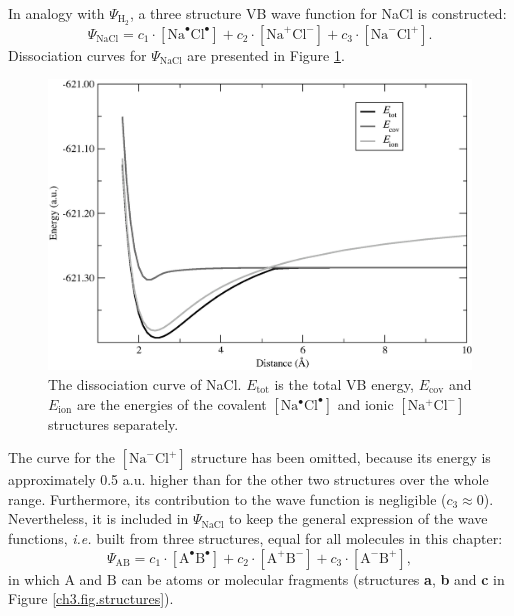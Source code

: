 In analogy with $\Psi_{\mathrm{H_2}}$, a three structure VB wave function for NaCl is constructed:
\begin{equation}
\nonumber
\Psi_{\mathrm{NaCl}} = c_1\cdot [\mathrm{Na}^\bullet \mathrm{Cl}^\bullet] + c_2 \cdot [\mathrm{Na}^{+}\mathrm{Cl}^{-}] + c_3 \cdot [\mathrm{Na}^{-}\mathrm{Cl}^{+}]. 
\end{equation}
Dissociation curves for $\Psi_{\mathrm{NaCl}}$ are presented in Figure \ref{ch3.fig.nacl_c}.
\begin{figure}[hbtp]
\begin{center}
\includegraphics[scale=0.6]{dissociation/figures/nacl_g.eps}
\end{center}
\caption{The dissociation curve of NaCl. $E_\mathrm{tot}$ is the total VB energy, $E_\mathrm{cov}$  and $E_\mathrm{ion}$ are the energies of the covalent $[\mathrm{Na^\bullet Cl^\bullet}]$ and ionic $[\mathrm{Na^{+}Cl^{-}}]$ structures separately.}
\label{ch3.fig.nacl_c}
\end{figure}
The curve for the $[\mathrm{Na}^{-}\mathrm{Cl}^{+}]$ structure has been omitted, because its energy is approximately 0.5 a.u. higher than for the other two structures over the whole range. Furthermore, its contribution to the wave function is negligible ($c_3 \approx 0$). Nevertheless, it is included in $\Psi_{\mathrm{NaCl}}$ to keep the general expression of the wave functions, \textit{i.e.} built from three structures, equal for all molecules in this chapter:
\begin{equation}
\nonumber
\Psi_{\mathrm{AB}} = c_1\cdot [\mathrm{A}^\bullet \mathrm{B}^\bullet] + c_2 \cdot [\mathrm{A}^{+}\mathrm{B}^{-}] 
+ c_3 \cdot [\mathrm{A}^{-}\mathrm{B}^{+}],
\end{equation}
in which $\mathrm{A}$ and $\mathrm{B}$ can be atoms or molecular fragments (structures \textbf{a}, \textbf{b} and \textbf{c} in Figure \ref{ch3.fig.structures}).

